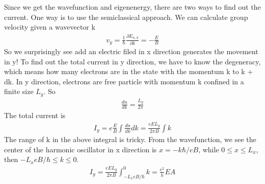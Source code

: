 \documentclass[a4paper]{article}
\begin{document}
Since we get the wavefunction and eigenenergy, there are two ways to find out the current. One way is to use the semiclassical approach. We can calculate group velocity given a wavevector k
\begin{align*}
	v_y = \frac{1}{\hbar} \frac{\partial E_{n,k}}{\partial k} = -\frac{E}{B}
\end{align*}
So we surprisingly see add an electric filed in x direction generates the movement in y!
To find out the total current in y direction, we have to know the degeneracy, which means how many electrons are in the state with the momentum k to k + dk. In y direction, electrons are free particle with momentum k confined in a finite size $L_y$. So
\begin{align*}
	\frac{dn}{dk} = \frac{L_y}{2 \pi}
\end{align*}
The total current is
\begin{align*}
	I_y = e \frac{E}{B} \int \frac{dn}{dk}dk = \frac{eEL_y}{2\pi B} \int k
\end{align*}
The range of k in the above integral is tricky. From the wavefunction, we see the center of the harmonic oscillator in x direction is $x = -k\hbar/eB$, while $ 0 \leq x \leq L_x$, then $-L_x eB/\hbar  \leq k \leq 0$.
\begin{align*}
	I_y = \frac{eEL_y}{2\pi B} \int_{-L_xeB/\hbar}^0 k = \frac{e^2}{h}EA
\end{align*}
\end{document}
